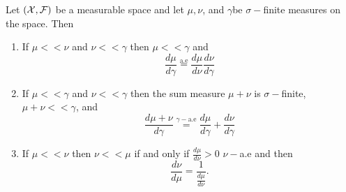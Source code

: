\begin{prop}
\label{prop:RadonNikodymFacts}Let $\left(\mathcal{X},\mathcal{F}\right)$ be a measurable
space and let $\mu,\nu$, and $\gamma$be $\sigma-$finite measures
on the space. Then

\begin{enumerate}[label=(\roman*),leftmargin=.1\linewidth,rightmargin=.4\linewidth]
	\item If $\mu<<\nu$ and $\nu<<\gamma$  then $\mu << \gamma$  and
\begin{equation}
\tag{Chain rule}
	\frac{d\mu}{d\gamma}\stackrel{\text{a.e}}{=}\frac{d\mu}{d\nu}\frac{d\nu}{d\gamma}
\label{eq:chainRule}
\end{equation}
	\item  If $\mu << \gamma $ and $\nu << \gamma $ then the sum measure $\mu + \nu$ is $\sigma-$finite, $\mu + \nu << \gamma$, and 
\begin{equation}
\tag{Sum Rule}
	\frac{d\mu+\nu}{d\gamma}\stackrel{\gamma-\text{a.e}}{=}\frac{d\mu}{d\gamma}+\frac{d\nu}{d\gamma}
\label{eq:sumRule}
\end{equation}
	\item If $\mu << \nu$ then $\nu << \mu$ if and only if $\frac{d\mu}{d\nu}>0$ $\nu-$a.e and then
\begin{equation}
\tag{Inverse ``function" rule}
	\frac{d\nu}{d\mu}=\frac{1}{\frac{d\mu}{d\nu}}.
\label{eq:invFunctionRule}
\end{equation}
\end{enumerate}
\end{prop}

